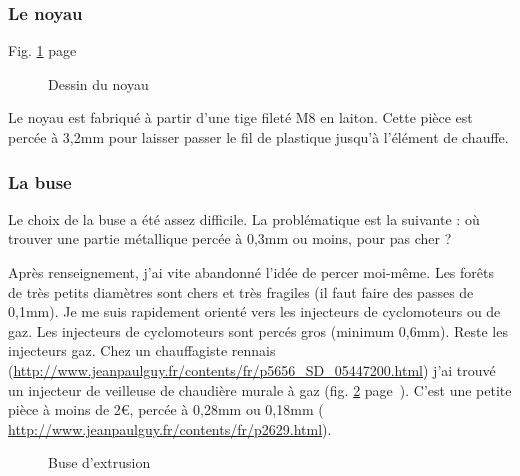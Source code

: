 \subsubsection{Le noyau}%
\noindent Fig. \ref{sch_noyau} page~\pageref{sch_noyau} \par %
\begin{figure}%
   \caption{\label{sch_noyau} Dessin du noyau}%
\end{figure}%
Le noyau est fabriqué à partir d'une tige fileté M8 en laiton. Cette pièce est percée à 3,2mm %
pour laisser passer le fil de plastique jusqu'à l'élément de chauffe.%
\subsubsection{La buse}%
Le choix de la buse a été assez difficile. La problématique est la suivante : où trouver %
une partie métallique percée à 0,3mm ou moins, pour pas cher ? \par%
Après renseignement, j'ai vite abandonné l'idée de percer moi-même. Les forêts de très petits %
diamètres sont chers et très fragiles (il faut faire des passes de 0,1mm). %
Je me suis rapidement orienté vers les injecteurs de cyclomoteurs ou de gaz. Les injecteurs de %
cyclomoteurs sont percés gros (minimum 0,6mm). Reste les injecteurs gaz. Chez un chauffagiste %
rennais (\url{http://www.jeanpaulguy.fr/contents/fr/p5656_SD_05447200.html}) j'ai trouvé un injecteur de veilleuse de chaudière murale à gaz (fig. \ref{buse} %
page~\pageref{buse}). C'est une petite pièce à moins de 2\euro{}, percée à 0,28mm ou 0,18mm (%
\url{http://www.jeanpaulguy.fr/contents/fr/p2629.html}).%
\begin{figure}%
   \caption{\label{buse} Buse d'extrusion}%
\end{figure}%